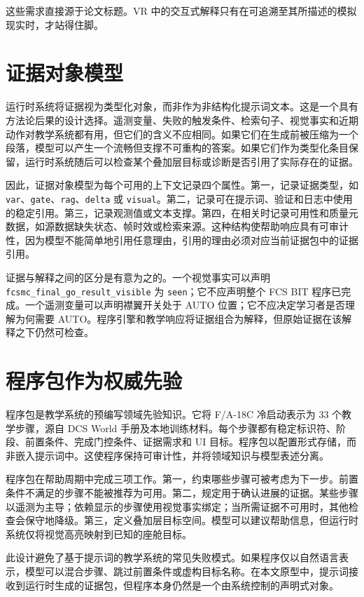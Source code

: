 这些需求直接源于论文标题。VR 中的交互式解释只有在可追溯至其所描述的模拟现实时，才站得住脚。

\section{证据对象模型}\label{sec:design-evidence-model}

运行时系统将证据视为类型化对象，而非作为非结构化提示词文本。这是一个具有方法论后果的设计选择。遥测变量、失败的触发条件、检索句子、视觉事实和近期动作对教学系统都有用，但它们的含义不应相同。如果它们在生成前被压缩为一个段落，模型可以产生一个流畅但支撑不可重构的答案。如果它们作为类型化条目保留，运行时系统随后可以检查某个叠加层目标或诊断是否引用了实际存在的证据。

因此，证据对象模型为每个可用的上下文记录四个属性。第一，记录证据类型，如 \texttt{var}、\texttt{gate}、\texttt{rag}、\texttt{delta} 或 \texttt{visual}。第二，记录可在提示词、验证和日志中使用的稳定引用。第三，记录观测值或文本支撑。第四，在相关时记录可用性和质量元数据，如源数据缺失状态、帧时效或检索来源。这种结构使帮助响应具有可审计性，因为模型不能简单地引用任意理由，引用的理由必须对应当前证据包中的证据引用。

证据与解释之间的区分是有意为之的。一个视觉事实可以声明 \texttt{fcsmc\_final\_go\_result\_visible} 为 \texttt{seen}；它不应声明整个 FCS BIT 程序已完成。一个遥测变量可以声明襟翼开关处于 AUTO 位置；它不应决定学习者是否理解为何需要 AUTO。程序引擎和教学响应将证据组合为解释，但原始证据在该解释之下仍然可检查。

\section{程序包作为权威先验}\label{sec:design-procedure}

程序包是教学系统的预编写领域先验知识。它将 F/A-18C 冷启动表示为 33 个教学步骤，源自 DCS World 手册及本地训练材料。每个步骤都有稳定标识符、阶段、前置条件、完成门控条件、证据需求和 UI 目标。程序包以配置形式存储，而非嵌入提示词中。这使程序保持可审计性，并将领域知识与模型表述分离。

程序包在帮助周期中完成三项工作。第一，约束哪些步骤可被考虑为下一步。前置条件不满足的步骤不能被推荐为可用。第二，规定用于确认进展的证据。某些步骤以遥测为主导；依赖显示的步骤使用视觉事实绑定；当所需证据不可用时，其他检查会保守地降级。第三，定义叠加层目标空间。模型可以建议帮助信息，但运行时系统仅将视觉高亮映射到已知的座舱目标。

此设计避免了基于提示词的教学系统的常见失败模式。如果程序仅以自然语言表示，模型可以混合步骤、跳过前置条件或虚构目标名称。在本文原型中，提示词接收到运行时生成的证据包，但程序本身仍然是一个由系统控制的声明式对象。

